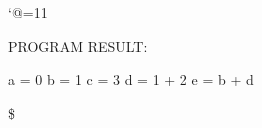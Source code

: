 \let\e\expandafter
\catcode`@=11









\def\@pytexChar@Backslash{\@pytexParser@parse}
\let\@pytexChar@Dollar\bye


%

PROGRAM RESULT:

\@pytexCatcodes@setallactive

a = 0
b = 1
c = 3
d = 1 + 2
e = b + d

\$
\bye
